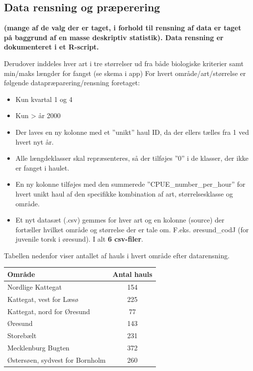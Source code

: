 \documentclass[
]{article}
\providecommand{\tightlist}{%
  \setlength{\itemsep}{0pt}\setlength{\parskip}{0pt}}
\begin{document}
\hypertarget{data-rensning-og-pruxe6perering}{%
\subsection{Data rensning og
præperering}\label{data-rensning-og-pruxe6perering}}

\textbf{(mange af de valg der er taget, i forhold til rensning af data
er taget på baggrund af en masse deskriptiv statistik). Data rensning er
dokumenteret i et R-script.}

Derudover inddeles hver art i tre størrelser ud fra både biologiske
kriterier samt min/maks længder for fangst (se skema i app) For hvert
område/art/størrelse er følgende datapræparering/rensning foretaget:

\begin{itemize}
\tightlist
\item
  Kun kvartal 1 og 4
\item
  Kun \textgreater{} år 2000
\item
  Der laves en ny kolonne med et ''unikt'' haul ID, da der ellers tælles
  fra 1 ved hvert nyt år.
\item
  Alle længdeklasser skal repræsenteres, så der tilføjes ''0'' i de
  klasser, der ikke er fanget i haulet.
\item
  En ny kolonne tilføjes med den summerede ''CPUE\_number\_per\_hour''
  for hvert unikt haul af den specifikke kombination af art,
  størrelsesklasse og område.
\item
  Et nyt datasæt (.csv) gemmes for hver art og en kolonne (source) der
  fortæller hvilket område og størrelse der er tale om. F.eks.
  øresund\_codJ (for juvenile torsk i øresund). I alt \textbf{6
  csv-filer}.
\end{itemize}

Tabellen nedenfor viser antallet af hauls i hvert område efter
datarensning.

\begin{longtable}[]{@{}lc@{}}
\toprule\noalign{}
Område & Antal hauls \\
\midrule\noalign{}
\endhead
\bottomrule\noalign{}
\endlastfoot
Nordlige Kattegat & 154 \\
Kattegat, vest for Læsø & 225 \\
Kattegat, nord for Øresund & 77 \\
Øresund & 143 \\
Storebælt & 231 \\
Mecklenburg Bugten & 372 \\
Østersøen, sydvest for Bornholm & 260 \\
\end{longtable}
\end{document}
